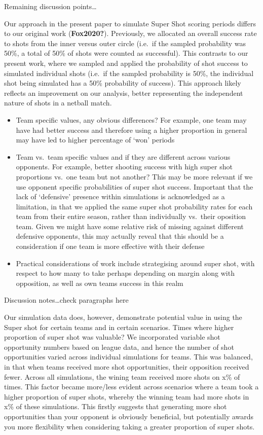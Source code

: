 \documentclass[]{elsarticle} %
\providecommand{\tightlist}{%
  \setlength{\itemsep}{0pt}\setlength{\parskip}{0pt}}
\begin{document}
Remaining discussion points\ldots{}

Our approach in the present paper to simulate Super Shot scoring periods
differs to our original work (\textbf{Fox2020?}). Previously, we
allocated an overall success rate to shots from the inner versus outer
circle (i.e.~if the sampled probability was 50\%, a total of 50\% of
shots were counted as successful). This contrasts to our present work,
where we sampled and applied the probability of shot success to
simulated individual shots (i.e.~if the sampled probability is 50\%, the
individual shot being simulated has a 50\% probability of success). This
approach likely reflects an improvement on our analysis, better
representing the independent nature of shots in a netball match.

\begin{itemize}
\tightlist
\item
  Team specific values, any obvious differences? For example, one team
  may have had better success and therefore using a higher proportion in
  general may have led to higher percentage of `won' periods
\item
  Team vs.~team specific values and if they are different across various
  opponents. For example, better shooting success with high super shot
  proportions vs.~one team but not another? This may be more relevant if
  we use opponent specific probabilities of super shot success.
  Important that the lack of `defensive' presence within simulations is
  acknowledged as a limitation, in that we applied the same super shot
  probability rates for each team from their entire season, rather than
  individually vs.~their oposition team. Given we might have some
  relative risk of missing against different defensive opponents, this
  may actually reveal that this should be a consideration if one team is
  more effective with their defense
\item
  Practical considerations of work include strategising around super
  shot, with respect to how many to take perhaps depending on margin
  along with opposition, as well as own teams success in this realm
\end{itemize}

Discussion notes\ldots check paragraphs here

Our simulation data does, however, demonstrate potential value in using
the Super shot for certain teams and in certain scenarios. Times where
higher proportion of super shot was valuable? We incorporated variable
shot opportunity numbers based on league data, and hence the number of
shot opportunities varied across individual simulations for teams. This
was balanced, in that when teams received more shot opportunities, their
opposition received fewer. Across all simulations, the wining team
received more shots on x\% of times. This factor became more/less
evident across scenarios where a team took a higher proportion of super
shots, whereby the winning team had more shots in x\% of these
simulations. This firstly suggests that generating more shot
opportunities than your opponent is obviously beneficial, but
potentially awards you more flexibility when considering taking a
greater proportion of super shots.
\end{document}

